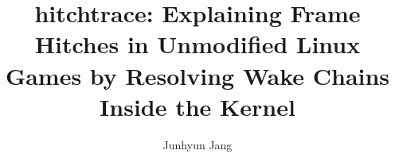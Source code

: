 \documentclass[conference,compsoc]{IEEEtran}
\newcommand{\sys}{hitchtrace\xspace}
\begin{document}
\title{\sys: Explaining Frame Hitches in Unmodified Linux Games by Resolving Wake Chains Inside the Kernel}
\author{Junhyun Jang}
\date{}

\maketitle
\pagestyle{plain}













% 
\end{document}
